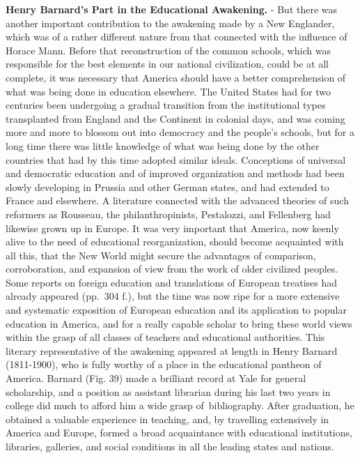 \documentclass[
]{book}
\begin{document}
\textbf{Henry Barnard's Part in the Educational Awakening.} - But there was another important contribution to the awakening made by a New Englander, which was of a rather different nature from that connected with the influence of Horace Mann. Before that reconstruction of the common schools, which was responsible for the best elements in our national civilization, could be at all complete, it was necessary that America should have a better comprehension of what was being done in education elsewhere. The United States had for two centuries been undergoing a gradual transition from the institutional types transplanted from England and the Continent in colonial days, and was coming more and more to blossom out into democracy and the people's schools, but for a long time there was little knowledge of what was being done by the other countries that had by this time adopted similar ideals. Conceptions of universal and democratic education and of improved organization and methods had been slowly developing in Prussia and other German states, and had extended to France and elsewhere. A literature connected with the advanced theories of such reformers as Rousseau, the philanthropinists, Pestalozzi, and Fellenberg had likewise grown up in Europe. It was very important that America, now keenly alive to the need of educational reorganization, should become acquainted with all this, that the New World might secure the advantages of comparison, corroboration, and expansion of view from the work of older civilized peoples. Some reports on foreign education and translations of European treatises had already appeared (pp.~304 f.), but the time was now ripe for a more extensive and systematic exposition of European education and its application to popular education in America, and for a really capable scholar to bring these world views within the grasp of all classes of teachers and educational authorities. This literary representative of the awakening appeared at length in Henry Barnard (1811-1900), who is fully worthy of a place in the educational pantheon of America. Barnard (Fig. 39) made a brilliant record at Yale for general scholarship, and a position as assistant librarian during his last two years in college did much to afford him a wide grasp of~bibliography. After graduation, he obtained a valuable experience in teaching, and, by travelling extensively in America and Europe, formed a broad acquaintance with educational institutions, libraries, galleries, and social conditions in all the leading states and nations.
\end{document}
